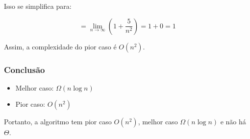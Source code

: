 Isso se simplifica para:

\[
= \lim_{n \to \infty} \left(1 + \frac{5}{n^2}\right) = 1 + 0 = 1
\]

Assim, a complexidade do pior caso é \(O(n^2)\).

\subsubsection{Conclusão}
\begin{itemize}
  \item Melhor caso: \(\Omega(n \log n)\)
  \item Pior caso: \(O(n^2)\)
\end{itemize}

Portanto, a algoritmo tem pior caso \(O(n^2)\), melhor caso \(\Omega(n \log n)\) e não há $\Theta$.